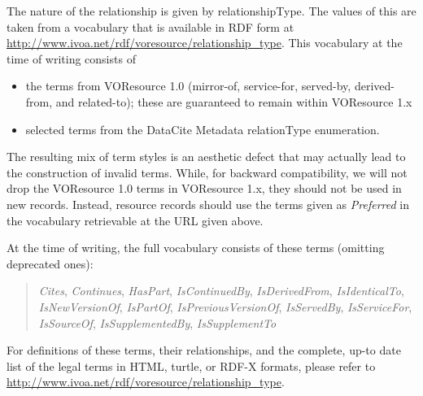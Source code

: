 \documentclass[11pt,a4paper]{ivoa}
\begin{document}
The nature of the relationship is given by relationshipType.  The values
of this are taken from a vocabulary that is available in RDF form at
\url{http://www.ivoa.net/rdf/voresource/relationship_type}.  This
vocabulary at the time of writing consists of

\begin{itemize}
\item the terms from VOResource 1.0 (mirror-of, service-for, served-by,
derived-from, and related-to); these are guaranteed to remain within
VOResource 1.x
\item selected terms from the DataCite Metadata relationType enumeration.
\end{itemize}

The resulting mix of term styles is an aesthetic defect that may
actually lead to the construction of invalid terms.  While, for backward
compatibility, we will not drop the VOResource 1.0 terms in
VOResource 1.x, they should not be used in new records.  Instead,
resource records should use the terms given as \emph{Preferred} in the
vocabulary retrievable at the URL given above.

At the time of writing, the full vocabulary consists of these terms
(omitting deprecated ones):

\begin{quotation}\noindent
\raggedright
\textsl{Cites},
\textsl{Continues},
\textsl{HasPart},
\textsl{IsContinuedBy},
\textsl{IsDerivedFrom},
\textsl{IsIdenticalTo},
\textsl{IsNewVersionOf},
\textsl{IsPartOf},
\textsl{IsPreviousVersionOf},
\textsl{IsServedBy},
\textsl{IsServiceFor},
\textsl{IsSourceOf},
\textsl{IsSupplementedBy},
\textsl{IsSupplementTo}
\end{quotation}

For definitions of these terms, their relationships, and the complete,
up-to date list of the legal terms in HTML, turtle, or RDF-X formats,
please refer to \url{http://www.ivoa.net/rdf/voresource/relationship_type}.
\end{document}
